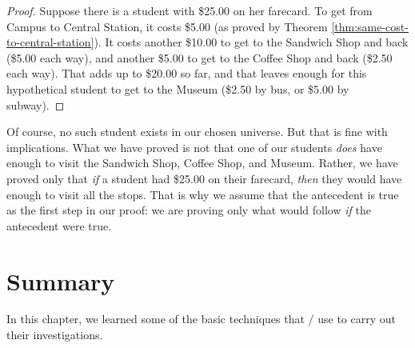 \documentclass[../../../main.tex]{subfiles}
\begin{document}
\begin{framed}
  \begin{proof}
    Suppose there is a student with \$25.00 on her farecard. To get from Campus to Central Station, it costs \$5.00 (as proved by Theorem \ref{thm:same-cost-to-central-station}). It costs another \$10.00 to get to the Sandwich Shop and back (\$5.00 each way), and another \$5.00 to get to the Coffee Shop and back (\$2.50 each way). That adds up to \$20.00 so far, and that leaves enough for this hypothetical student to get to the Museum (\$2.50 by bus, or \$5.00 by subway).
  \end{proof}
\end{framed}

Of course, no such student exists in our chosen universe. But that is fine with implications. What we have proved is not that one of our students \emph{does} have enough to visit the Sandwich Shop, Coffee Shop, and Museum. Rather, we have proved only that \emph{if} a student had \$25.00 on their farecard, \emph{then} they would have enough to visit all the stops. That is why we assume that the antecedent is true as the first step in our proof: we are proving only what would follow \emph{if} the antecedent were true.


\section{Summary}

In this chapter, we learned some of the basic techniques that \mathers/ use to carry out their investigations. 
\end{document}
